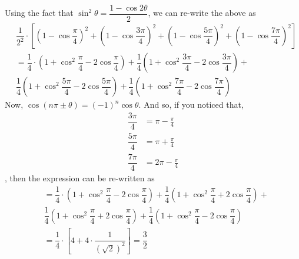\begin{solution}
  \begin{fullwidth}
    Using the fact that $\sin^2\theta = \dfrac{1-\cos 2\theta}{2}$,  we can re-write the above as
    \begin{align}
       &\dfrac{1}{2^2}\cdot\left[\left( 1-\cos\dfrac{\pi}{4}\right)^2 + 
       \left( 1-\cos\dfrac{3\pi}{4}\right)^2
       + \left( 1-\cos\dfrac{5\pi}{4}\right)^2 + 
       \left( 1-\cos\dfrac{7\pi}{4}\right)^2\right] \\
       &= \dfrac{1}{4}\cdot\left( 1 + \cos^2\dfrac{\pi}{4} - 2\cos\dfrac{\pi}{4}\right) +
          \dfrac{1}{4}\left( 1 + \cos^2\dfrac{3\pi}{4} - 2\cos\dfrac{3\pi}{4}\right) + \nonumber \\
       & \dfrac{1}{4}\left( 1 + \cos^2\dfrac{5\pi}{4} - 2\cos\dfrac{5\pi}{4}\right) + 
          \dfrac{1}{4}\left( 1 + \cos^2\dfrac{7\pi}{4} - 2\cos\dfrac{7\pi}{4}\right) 
    \end{align}
    Now, $\cos(n\pi \pm \theta) = (-1)^{n}\cos\theta$. And so, if you noticed that,
    \begin{align}
    	\dfrac{3\pi}{4} &= \pi - \frac{\pi}{4} \\
    	\dfrac{5\pi}{4} &= \pi + \frac{\pi}{4} \\
    	\dfrac{7\pi}{4} &= 2\pi - \frac{\pi}{4}
    \end{align}
    , then the expression can be re-written as 
    \begin{align}
       &= \dfrac{1}{4}\cdot\left( 1 + \cos^2\dfrac{\pi}{4} - 2\cos\dfrac{\pi}{4}\right) +
          \dfrac{1}{4}\left( 1 + \cos^2\dfrac{\pi}{4} + 2\cos\dfrac{\pi}{4}\right) + \nonumber \\
       & \dfrac{1}{4}\left( 1 + \cos^2\dfrac{\pi}{4} + 2\cos\dfrac{\pi}{4}\right) + 
          \dfrac{1}{4}\left( 1 + \cos^2\dfrac{\pi}{4} - 2\cos\dfrac{\pi}{4}\right) \\
       &= \dfrac{1}{4}\cdot\left[ 4 + 4\cdot\dfrac{1}{(\sqrt{2})^2}\right] = \dfrac{3}{2} 
    \end{align}
  \end{fullwidth}
\end{solution}
